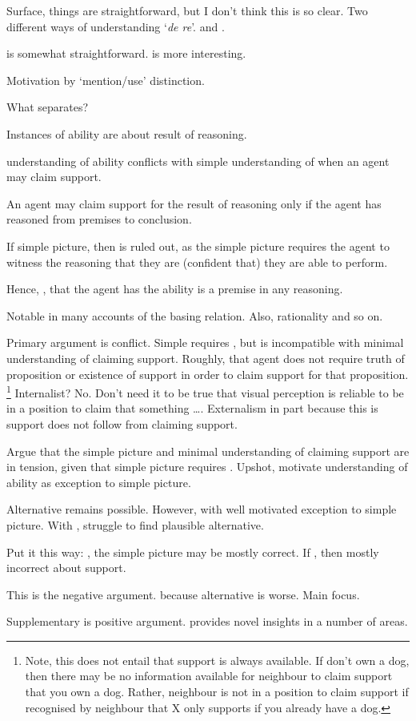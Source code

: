 \begin{note}
  Surface, things are straightforward, but I don't think this is so clear.
  Two different ways of understanding `\emph{de re}'.
  \AR{} and \WR{}.

  \AR{} is somewhat straightforward.
  \WR{} is more interesting.

  Motivation by `mention/use' distinction.
\end{note}

\begin{note}
  What separates?

  Instances of ability are about result of reasoning.

  \WR{} understanding of ability conflicts with simple understanding of when an agent may claim support.

  An agent may claim support for the result of reasoning only if the agent has reasoned from premises to conclusion.

  If simple picture, then \WR{} is ruled out, as the simple picture requires the agent to witness the reasoning that they are (confident that) they are able to perform.

  Hence, \AR{}, that the agent has the ability is a premise in any reasoning.
\end{note}

\begin{note}
  Notable in many accounts of the basing relation.
  Also, rationality and so on.

  Primary argument is conflict.
  Simple requires \AR{}, but \AR{} is incompatible with minimal understanding of claiming support.
  Roughly, that agent does not require truth of proposition or existence of support in order to claim support for that proposition.\nolinebreak
  \footnote{
    Note, this does not entail that support is always available.
    If don't own a dog, then there may be no information available for neighbour to claim support that you own a dog.
    Rather, neighbour is not in a position to claim support if recognised by neighbour that X only supports if you already have a dog.
  }
  Internalist?
  No.
  Don't need it to be true that visual perception is reliable to be in a position to claim that something \dots.
  Externalism in part because this is support does not follow from claiming support.

  Argue that the simple picture and minimal understanding of claiming support are in tension, given that simple picture requires \AR{}.
  Upshot, motivate \WR{} understanding of ability as exception to simple picture.

  Alternative remains possible.
  However, with \WR{} well motivated exception to simple picture.
  With \AR{}, struggle to find plausible alternative.

  Put it this way:
  \WR{}, the simple picture may be mostly correct.
  If \AR{}, then mostly incorrect about support.

  This is the negative argument.
  \WR{} because alternative is worse.
  Main focus.

  Supplementary is positive argument.
  \WR{} provides novel insights in a number of areas.
\end{note}


